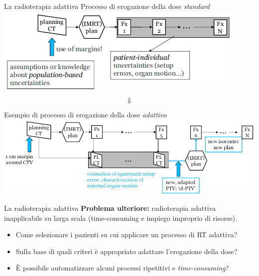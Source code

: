 \documentclass{beamer}
\begin{document}
\begin{frame}{La radioterapia adattiva}
\centering
\alert{Processo di erogazione della dose \textit{standard}}\\ \vspace{.4cm}
\includegraphics[width=.7\textwidth]{../cap3/Adapt0.png}
$$\large \Downarrow$$
\alert{Esempio di processo di erogazione della dose \textit{adattivo}}\\ \vspace{.4cm}
\includegraphics[width=.8\textwidth]{../cap3/Adapt2.png}

\end{frame}



\begin{frame}{La radioterapia adattiva}
\footnotesize
\alert{\bf Problema ulteriore:} radioterapia adattiva inapplicabile su larga scala (time-consuming e impiego improprio di risorse).
\begin{itemize}
\item Come selezionare i pazienti su cui applicare un processo di RT adattiva?
\item Sulla base di quali criteri è appropriato adattare l'erogazione della dose?
\item \`E possibile automatizzare alcuni processi ripetitivi e \textit{time-consuming}?
\end{itemize}
\vspace{.5cm}

\end{frame}
\end{document}
